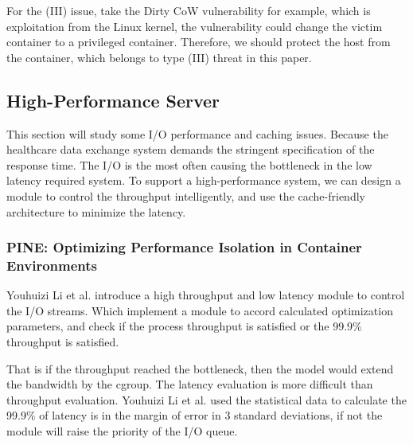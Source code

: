 \documentclass[12pt,a4paper]{article}
\begin{document}
For the (\RN{3}) issue, take the Dirty CoW vulnerability for example, which is exploitation
from the Linux kernel, the vulnerability could change the victim container to a privileged
container. Therefore, we should protect the host from the container, which belongs to type
(\RN{3}) threat in this paper.

\subsection{High-Performance Server}
\hypertarget{heigh_performance}{}
This section will study some I/O performance and caching issues. Because the healthcare
data exchange system demands the stringent specification of the response time.
The I/O is the most often causing the bottleneck in the low latency required system.
To support a high-performance system, we can design a module to control the throughput
intelligently, and use the cache-friendly architecture to minimize the latency.

\subsubsection{PINE: Optimizing Performance Isolation in Container Environments}
Youhuizi Li et al. \cite{Optimizing} introduce a high throughput and low latency module to control
the I/O streams. Which implement a module to accord calculated optimization parameters,
and check if the process throughput is satisfied or the 99.9\% throughput is satisfied.

That is if the throughput reached the bottleneck, then the model would extend the
bandwidth by the cgroup. The latency evaluation is more difficult than throughput
evaluation. Youhuizi Li et al. \cite{Optimizing} used the statistical data to calculate
the 99.9\% of latency is in the margin of error in 3 standard deviations, if not the
module will raise the priority of the I/O queue.
\end{document}
